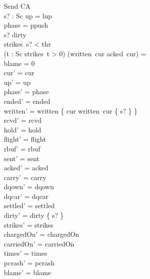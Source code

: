 \documentclass[a4paper,10pt,fleqn]{article}
\begin{document}
\begin{schema}{Send}
  \Delta CA \\
  s? : Sc
\where
  up = lup \\
  phase = ppush \\
  s? \in dirty \\
  strikes~s? < thr \\
  (\exists t : Sc \spot strikes~t > 0) \implies (written~cur \setminus acked~cur) = \emptyset \\
  blame = 0 \\
  cur' = cur \\
  up' = up \\
  phase' = phase \\
  ended' = ended \\
  written' = written \oplus \{ cur \mapsto written~cur \cup \{ s? \} \} \\
  rcvd' = rcvd \\
  hold' = hold \\
  flight' = flight \\
  rbuf' = rbuf \\
  sent' = sent \\
  acked' = acked \\
  carry' = carry \\
  dqown' = dqown \\
  dqcar' = dqcar \\
  settled' = settled \\
  dirty' = dirty \setminus \{ s? \} \\
  strikes' = strikes \\
  chargedOn' = chargedOn \\
  carriedOn' = carriedOn \\
  times' = times \\
  pcrash' = pcrash \\
  blame' = blame
\end{schema}
\end{document}
